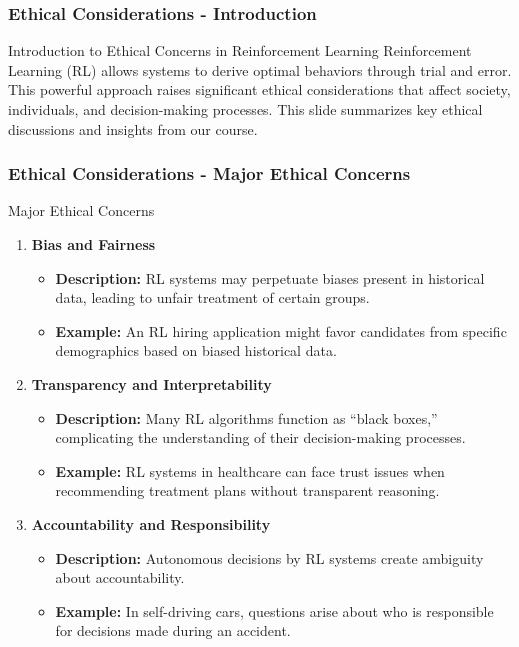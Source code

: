 \documentclass[aspectratio=169]{beamer}
\begin{document}
\begin{frame}[fragile]
    \frametitle{Ethical Considerations - Introduction}
    \begin{block}{Introduction to Ethical Concerns in Reinforcement Learning}
        Reinforcement Learning (RL) allows systems to derive optimal behaviors through trial and error. This powerful approach raises significant ethical considerations that affect society, individuals, and decision-making processes. This slide summarizes key ethical discussions and insights from our course.
    \end{block}
\end{frame}

\begin{frame}[fragile]
    \frametitle{Ethical Considerations - Major Ethical Concerns}
    \begin{block}{Major Ethical Concerns}
        \begin{enumerate}
            \item \textbf{Bias and Fairness}
                \begin{itemize}
                    \item \textbf{Description:} RL systems may perpetuate biases present in historical data, leading to unfair treatment of certain groups.
                    \item \textbf{Example:} An RL hiring application might favor candidates from specific demographics based on biased historical data.
                \end{itemize}
            \item \textbf{Transparency and Interpretability}
                \begin{itemize}
                    \item \textbf{Description:} Many RL algorithms function as “black boxes,” complicating the understanding of their decision-making processes.
                    \item \textbf{Example:} RL systems in healthcare can face trust issues when recommending treatment plans without transparent reasoning.
                \end{itemize}
            \item \textbf{Accountability and Responsibility}
                \begin{itemize}
                    \item \textbf{Description:} Autonomous decisions by RL systems create ambiguity about accountability.
                    \item \textbf{Example:} In self-driving cars, questions arise about who is responsible for decisions made during an accident.
                \end{itemize}
        \end{enumerate}
    \end{block}
\end{frame}
\end{document}
